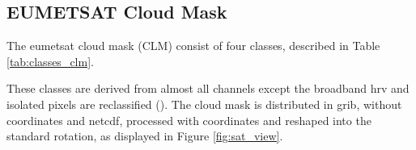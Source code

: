 \subsection{EUMETSAT Cloud Mask} \label{sec:EUMETSAT_cloud_mask}
The \acrshort{eumetsat} cloud mask (CLM) consist of four classes, described in Table \ref{tab:classes_clm}.

These classes are derived from almost all channels except the broadband \acrfull{hrv} and isolated pixels are reclassified (\cite{Tavarat10_Derrien}). The cloud mask is distributed in \acrfull{grib},  without coordinates and \acrfull{netcdf}, processed with coordinates and reshaped into the standard rotation, as displayed in Figure \ref{fig:sat_view}.

